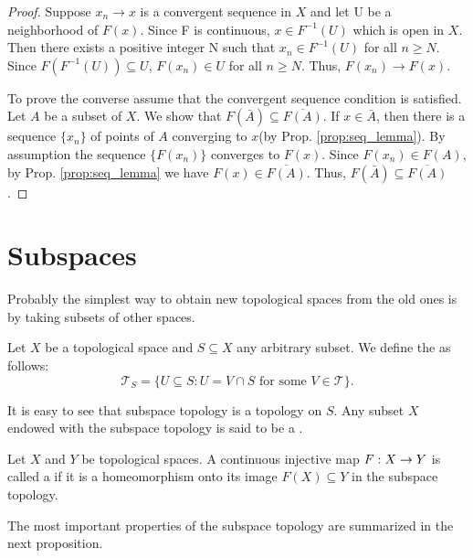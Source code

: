 \documentclass[11pt,a4paper]{article}
\begin{document}
\begin{proof}
    Suppose $x_n\rightarrow x$ is a convergent sequence in $X$ and let U be a neighborhood of $F(x)$. Since F is continuous, $x\in F^{-1}(U)$ which is open in $X$. Then there exists a positive integer N such that $x_n\in F^{-1}(U)$ for all $n\ge N$. Since $F(F^{-1}(U))\subseteq U$, $F(x_n)\in U$ for all $n\ge N$. Thus, $F(x_n)\rightarrow F(x)$.
    
    To prove the converse assume that the convergent sequence condition is satisfied. Let $A$ be a subset of $X$. We show that $F(\bar{A})\subseteq \overline{F(A)}$. If $x\in \bar{A}$, then there is a sequence $\{x_n\}$ of points of $A$ converging to $x$(by Prop. \ref{prop:seq_lemma}). By assumption the sequence $\{F(x_n)\}$ converges to $F(x)$. Since $F(x_n)\in F(A)$, by Prop. \ref{prop:seq_lemma} we have $F(x)\in \overline{F(A)}$. Thus, $F(\bar{A})\subseteq \overline{F(A)}$.
\end{proof}

\section{Subspaces}

Probably the simplest way to obtain new topological spaces from the old ones is by taking subsets of other spaces.

\begin{definition}
    Let $X$ be a topological space and $S\subseteq X$ any arbitrary subset. We define the  as follows:
    $$
        \mathcal{T}_S = \{U\subseteq S: U = V\cap S \text{ for some } V\in \mathcal{T}\}.
    $$
\end{definition}

It is easy to see that subspace topology is a topology on $S$. Any subset $X$ endowed with the subspace topology is said to be a .

\begin{definition}
    Let $X$ and $Y$ be topological spaces. A continuous injective map $F:X\rightarrow Y$ is called a  if it is a homeomorphism onto its image $F(X)\subseteq Y$ in the subspace topology.
\end{definition}

The most important properties of the subspace topology are summarized in the next proposition.
\end{document}
